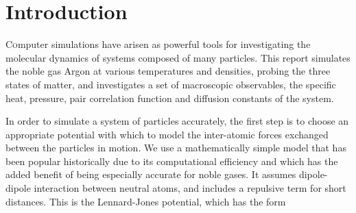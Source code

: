 \section{Introduction}

\lettrine[nindent=0em,lines=3]{C} omputer simulations have arisen as powerful
tools for investigating the molecular dynamics of systems composed of
many particles. This report simulates the noble gas Argon at various temperatures
and densities, probing the three states of matter, and investigates a set of
macroscopic observables, the specific heat, pressure, pair correlation function
and diffusion constants of the system. \cite{nielsen10_quant}

In order to simulate a system of particles accurately, the first step is to
choose an appropriate potential with which to model the inter-atomic forces
exchanged between the particles in motion. We use a mathematically simple model
that has been popular historically due to its computational efficiency and which
has the added benefit of being especially accurate for noble gases. It assumes
dipole-dipole interaction between neutral atoms, and includes a repulsive term
for short distances. This is the Lennard-Jones potential, which has the form


